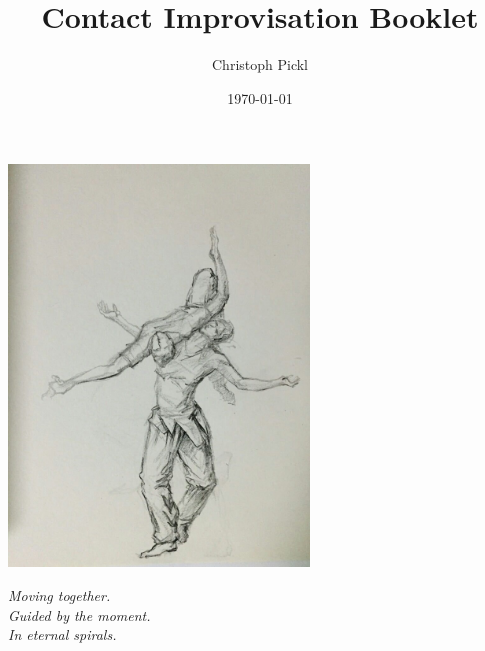 \documentclass{article}
\title{Contact Improvisation Booklet}
\date{\today}
\author{Christoph Pickl}
\begin{document}
\maketitle

\begin{center}
	\includegraphics[width=8cm]{images/cover.jpg}
	\vspace{0.5cm}
	
	\textit{Moving together.}\\
	\textit{Guided by the moment.}\\
	\textit{In eternal spirals.}
\end{center}
\newpage

\tableofcontents
\newpage



\end{document}
